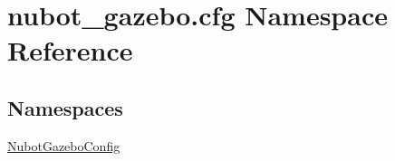 \hypertarget{namespacenubot__gazebo_1_1cfg}{\section{nubot\-\_\-gazebo.\-cfg Namespace Reference}
\label{namespacenubot__gazebo_1_1cfg}
}
\subsection*{Namespaces}
\begin{DoxyCompactItemize}
\item 
\hyperlink{namespacenubot__gazebo_1_1cfg_1_1NubotGazeboConfig}{Nubot\-Gazebo\-Config}
\end{DoxyCompactItemize}
